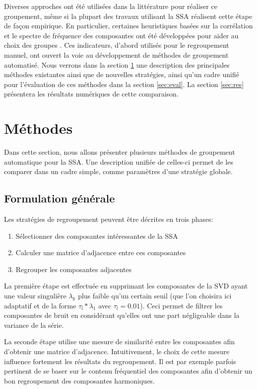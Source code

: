 \documentclass{gretsi}
\begin{document}
Diverses approches ont été utilisées dans la littérature pour réaliser ce groupement, même si la plupart des travaux utilisant la SSA réalisent cette étape de façon empirique. En particulier, certaines heuristiques basées sur la corrélation et le spectre de fréquence des composantes ont été développées pour aider au choix des groupes \cite{Golyandina_10_ssa}. Ces indicateurs, d'abord utilisés pour le regroupement manuel, ont ouvert la voie au développement de méthodes de groupement automatisé. Nous verrons dans la section \ref{sec:met} une description des principales méthodes existantes ainsi que de nouvelles stratégies, ainsi qu'un cadre unifié pour l'évaluation de ces méthodes dans la section \ref{sec:eval}. La section \ref{sec:res} présentera les résultats numériques de cette comparaison.


\section{Méthodes}
\label{sec:met}

Dans cette section, nous allons présenter plusieurs méthodes de groupement automatique pour la SSA. Une description unifiée de celles-ci permet de les comparer dans un cadre simple, comme paramètres d'une stratégie globale.

\subsection{Formulation générale}
\label{sub:form}

Les stratégies de regroupement peuvent être décrites en trois phases:
\begin{enumerate}
	\item Sélectionner des composantes intéressantes de la SSA
	\item Calculer une matrice d'adjacence entre ces composantes
	\item Regrouper les composantes adjacentes
\end{enumerate}
La première étape est effectuée en supprimant les composantes de la SVD ayant une valeur singulière $\lambda_k$ plus faible qu'un certain seuil (que l'on choisira ici adaptatif et de la forme  $\tau_l*\lambda_1$ avec $\tau_l = 0.01$). Ceci permet de filtrer les composantes de bruit en considérant qu'elles ont une part négligeable dans la variance de la série. 

La seconde étape utilise une mesure de similarité entre les composantes afin d'obtenir une matrice d'adjacence. Intuitivement, le choix de cette mesure influence fortement les résultats du regroupement. Il est par exemple parfois pertinent de se  baser sur le contenu fréquentiel des composantes afin d'obtenir un bon regroupement des composantes harmoniques.
\end{document}
